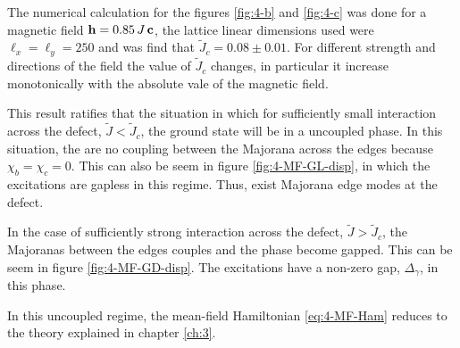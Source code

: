 
The numerical calculation for the figures \ref{fig:4-b} and \ref{fig:4-c} was done for a magnetic field $\bf{h} = 0.85 \, J \, \bf{c}$, the lattice linear dimensions used were $\ell_x = \ell_y = 250$ and was find that $\tilde{J}_c = 0.08 \pm 0.01$. For different strength and directions of the field the value of $\tilde{J}_c$ changes, in particular it increase monotonically with the absolute vale of the magnetic field.


This result ratifies that the situation in which for sufficiently small interaction across the defect, $\tilde{J}<\tilde{J}_c$, the ground state will be in a uncoupled phase. In this situation, the are no coupling between the Majorana across the edges because $\chi_b=\chi_c=0$. This can also be seem in figure \ref{fig:4-MF-GL-disp}, in which the excitations are gapless in this regime. Thus, exist Majorana edge modes at the defect.

In the case of sufficiently strong interaction across the defect, $\tilde{J}>\tilde{J}_c$, the Majoranas between the edges couples and the phase become gapped. This can be seem in figure \ref{fig:4-MF-GD-disp}. The excitations have a non-zero gap, $\Delta_{\gamma}$, in this phase.

In this uncoupled regime, the mean-field Hamiltonian \eqref{eq:4-MF-Ham} reduces to the theory explained in chapter \ref{ch:3}.


